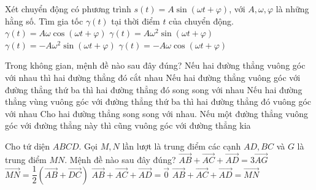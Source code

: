 \begin{ex}%
    Xét chuyển động có phương trình $s(t)=A\sin \left(\omega t+\varphi \right)$, với $A,\omega,\varphi $ là những hằng số. Tìm gia tốc $\gamma(t)$ tại thời điểm $t$ của chuyển động.
    \choice
    {$\gamma (t)=A\omega \cos \left(\omega t+\varphi \right)$}
    {$\gamma (t)=A\omega^2\sin \left(\omega t+\varphi \right)$}
    {\True $\gamma (t)=-A\omega^2\sin \left(\omega t+\varphi \right)$}
    {$\gamma (t)=-A\omega \cos \left(\omega t+\varphi \right)$}
\end{ex}

\begin{ex}%
    Trong không gian, mệnh đề nào sau đây đúng?
    \choice
    {Nếu hai đường thẳng vuông góc với nhau thì hai đường thẳng đó cắt nhau}
    {Nếu hai đường thẳng vuông góc với đường thẳng thứ ba thì hai đường thẳng đó song song với nhau}
    {Nếu hai đường thẳng vùng vuông góc với đường thẳng thứ ba thì hai đường thẳng đó vuông góc với nhau}
    {\True Cho hai đường thẳng song song với nhau. Nếu một đường thẳng vuông góc với đường thẳng này thì cũng vuông góc với đường thẳng kia}
\end{ex}

\begin{ex}%
    Cho tứ diện $ABCD$. Gọi $M,N$ lần lượt là trung điểm các cạnh $AD,BC$ và $G$ là trung điểm $MN$. Mệnh đề nào sau đây đúng?
    \choice
    {$\overrightarrow{AB}+\overrightarrow{AC}+\overrightarrow{AD}=3\overrightarrow{AG}$}
    {\True $\overrightarrow{MN}=\dfrac{1}{2}\left(\overrightarrow{AB}+\overrightarrow{DC}\right)$}
    {$\overrightarrow{AB}+\overrightarrow{AC}+\overrightarrow{AD}=\overrightarrow{0}$}
    {$\overrightarrow{AB}+\overrightarrow{AC}+\overrightarrow{AD}=\overrightarrow{MN}$}
\end{ex}

